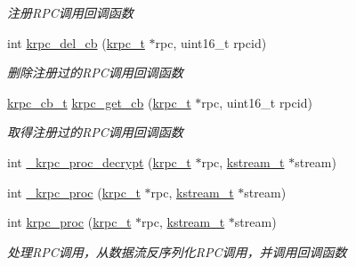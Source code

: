 \begin{DoxyCompactItemize}
\begin{DoxyCompactList}\small\item\em 注册\+R\+P\+C调用回调函数 \end{DoxyCompactList}\item 
int \hyperlink{a00093_a76529ccab5c6f0ada79cac791e299ef9_a76529ccab5c6f0ada79cac791e299ef9}{krpc\+\_\+del\+\_\+cb} (\hyperlink{a00056_a1e414ac6f6de24462ccf81e10f63428d_a1e414ac6f6de24462ccf81e10f63428d}{krpc\+\_\+t} $\ast$rpc, uint16\+\_\+t rpcid)
\begin{DoxyCompactList}\small\item\em 删除注册过的\+R\+P\+C调用回调函数 \end{DoxyCompactList}\item 
\hyperlink{a00056_a06bb708c1b97445d3a5d0c1b32ad2ab6_a06bb708c1b97445d3a5d0c1b32ad2ab6}{krpc\+\_\+cb\+\_\+t} \hyperlink{a00093_a7841a0b4c828efcb607a51bbdd9c9ab1_a7841a0b4c828efcb607a51bbdd9c9ab1}{krpc\+\_\+get\+\_\+cb} (\hyperlink{a00056_a1e414ac6f6de24462ccf81e10f63428d_a1e414ac6f6de24462ccf81e10f63428d}{krpc\+\_\+t} $\ast$rpc, uint16\+\_\+t rpcid)
\begin{DoxyCompactList}\small\item\em 取得注册过的\+R\+P\+C调用回调函数 \end{DoxyCompactList}\item 
int \hyperlink{a00093_a87f076f27729e0d352ffd12173ab13ab_a87f076f27729e0d352ffd12173ab13ab}{\+\_\+krpc\+\_\+proc\+\_\+decrypt} (\hyperlink{a00056_a1e414ac6f6de24462ccf81e10f63428d_a1e414ac6f6de24462ccf81e10f63428d}{krpc\+\_\+t} $\ast$rpc, \hyperlink{a00056_acc208c4c40c875eebbfef88f00fffacf_acc208c4c40c875eebbfef88f00fffacf}{kstream\+\_\+t} $\ast$stream)
\item 
int \hyperlink{a00093_ae905b4f6864964a0080435a81748c3f1_ae905b4f6864964a0080435a81748c3f1}{\+\_\+krpc\+\_\+proc} (\hyperlink{a00056_a1e414ac6f6de24462ccf81e10f63428d_a1e414ac6f6de24462ccf81e10f63428d}{krpc\+\_\+t} $\ast$rpc, \hyperlink{a00056_acc208c4c40c875eebbfef88f00fffacf_acc208c4c40c875eebbfef88f00fffacf}{kstream\+\_\+t} $\ast$stream)
\item 
int \hyperlink{a00093_ac583f7d7c3e3ecb9954530e8d0f6f5f1_ac583f7d7c3e3ecb9954530e8d0f6f5f1}{krpc\+\_\+proc} (\hyperlink{a00056_a1e414ac6f6de24462ccf81e10f63428d_a1e414ac6f6de24462ccf81e10f63428d}{krpc\+\_\+t} $\ast$rpc, \hyperlink{a00056_acc208c4c40c875eebbfef88f00fffacf_acc208c4c40c875eebbfef88f00fffacf}{kstream\+\_\+t} $\ast$stream)
\begin{DoxyCompactList}\small\item\em 处理\+R\+P\+C调用，从数据流反序列化\+R\+P\+C调用，并调用回调函数 \end{DoxyCompactList}\item 

\end{DoxyCompactItemize}
